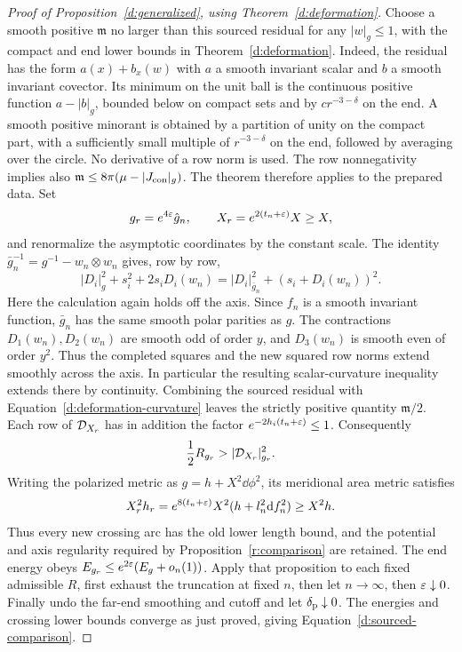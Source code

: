 \begin{proof}[Proof of Proposition~\ref{d:generalized}, using Theorem~\ref{d:deformation}]
Choose a smooth positive $\mathfrak m$ no larger than this sourced
residual for any $|w|_g\le1$, with the compact and end lower bounds in
Theorem~\ref{d:deformation}.  Indeed, the residual has the form
$a(x)+b_x(w)$ with $a$ a smooth invariant scalar and $b$ a smooth
invariant covector.  Its minimum on the unit ball is the continuous
positive function $a-|b|_g$, bounded below on compact sets and by
$c r^{-3-\delta}$ on the end.  A smooth positive minorant is obtained
by a partition of unity on the compact part, with a sufficiently
small multiple of $r^{-3-\delta}$ on the end, followed by averaging
over the circle.  No derivative of a row norm is used.  The row
nonnegativity implies also
$\mathfrak m\le8\pi(\mu-|J_{\rm con}|_g)$.  The theorem therefore
applies to the prepared data.  Set
\[
 g_r=e^{4\varepsilon}\hat g_n,\qquad X_r=e^{2(t_n+\varepsilon)}X\ge X,
\]
and renormalize the asymptotic coordinates by the constant scale.
The identity $\bar g_n^{-1}=g^{-1}-w_n\otimes w_n$ gives, row by row,
\begin{equation}\label{d:row-completion}
 |D_i|_g^2+s_i^2+2s_iD_i(w_n)
 =|D_i|_{\bar g_n}^2+(s_i+D_i(w_n))^2.
\end{equation}
Here the calculation again holds off the axis.  Since $f_n$ is a
smooth invariant function, $\bar g_n$ has the same smooth polar
parities as $g$.  The contractions $D_1(w_n),D_2(w_n)$ are smooth
odd of order $y$, and $D_3(w_n)$ is smooth even of order $y^2$.
Thus the completed squares and the new squared row norms extend
smoothly across the axis.  In particular the resulting
scalar-curvature inequality extends there by continuity.
Combining the sourced residual with
Equation~\eqref{d:deformation-curvature} leaves the strictly positive
quantity $\mathfrak m/2$.  Each row of $\mathcal D_{X_r}$ has in addition the
factor $e^{-2h_i(t_n+\varepsilon)}\le1$.  Consequently
\[
 \frac12R_{g_r}>|\mathcal D_{X_r}|_{g_r}^2.
\]
Writing the polarized metric as $g=h+X^2\dd\phi^2$, its meridional
area metric satisfies
\begin{equation}\label{d:length-monotonicity}
 X_r^2h_r=e^{8(t_n+\varepsilon)}X^2(h+l_n^2\mathrm d f_n^2)\ge X^2h.
\end{equation}
Thus every new crossing arc has the old lower length bound, and the
potential and axis regularity required by
Proposition~\ref{r:comparison} are retained.  The end energy obeys
$E_{g_r}\le e^{2\varepsilon}(E_g+o_n(1))$.  Apply that proposition to each
fixed admissible $R$, first exhaust the truncation at fixed $n$, then
let $n\to\infty$, then $\varepsilon\downarrow0$.  Finally undo the far-end
smoothing and cutoff and let $\delta_{\rm p}\downarrow0$.  The
energies and crossing lower bounds converge as just proved, giving
Equation~\eqref{d:sourced-comparison}.
\end{proof}

